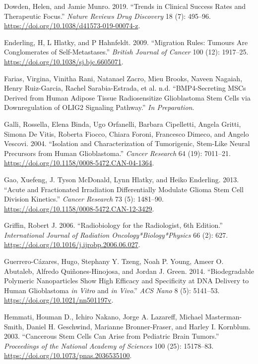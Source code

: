 \documentclass[
  default,
]{sn-jnl}
\newlength{\cslhangindent}
\newenvironment{CSLReferences}[2] %
 {\begin{list}{}{%
  \setlength{\itemindent}{0pt}
  \setlength{\leftmargin}{0pt}
  \setlength{\parsep}{0pt}
  \ifodd #1
   \setlength{\leftmargin}{\cslhangindent}
   \setlength{\itemindent}{-1\cslhangindent}
  \fi
  \setlength{\itemsep}{#2\baselineskip}}}
 {\end{list}}
\begin{document}
\begin{CSLReferences}{1}{0}
Dowden, Helen, and Jamie Munro. 2019. {``Trends in Clinical Success
Rates and Therapeutic Focus.''} \emph{Nature Reviews Drug Discovery} 18
(7): 495--96. \url{https://doi.org/10.1038/d41573-019-00074-z}.

Enderling, H, L Hlatky, and P Hahnfeldt. 2009. {``Migration Rules:
Tumours Are Conglomerates of Self-Metastases.''} \emph{British Journal
of Cancer} 100 (12): 1917--25.
\url{https://doi.org/10.1038/sj.bjc.6605071}.

Farias, Virgina, Vinitha Rani, Natanael Zacro, Mieu Brooks, Naveen
Nagaiah, Henry Ruiz-Garcia, Rachel Sarabia-Estrada, et al. n.d.
{``BMP4-Secreting MSCs Derived from Human Adipose Tissue Radiosensitize
Glioblastoma Stem Cells via Downregulation of OLIG2 Signaling
Pathway.''} \emph{In Preparation}.

Galli, Rossella, Elena Binda, Ugo Orfanelli, Barbara Cipelletti, Angela
Gritti, Simona De Vitis, Roberta Fiocco, Chiara Foroni, Francesco
Dimeco, and Angelo Vescovi. 2004. {``Isolation and Characterization of
Tumorigenic, Stem-Like Neural Precursors from Human Glioblastoma.''}
\emph{Cancer Research} 64 (19): 7011--21.
\url{https://doi.org/10.1158/0008-5472.CAN-04-1364}.

Gao, Xuefeng, J. Tyson McDonald, Lynn Hlatky, and Heiko Enderling. 2013.
{``Acute and Fractionated Irradiation Differentially Modulate Glioma
Stem Cell Division Kinetics.''} \emph{Cancer Research} 73 (5): 1481--90.
\url{https://doi.org/10.1158/0008-5472.CAN-12-3429}.

Griffin, Robert J. 2006. {``Radiobiology for the Radiologist, 6th
Edition.''} \emph{International Journal of Radiation
Oncology*Biology*Physics} 66 (2): 627.
\url{https://doi.org/10.1016/j.ijrobp.2006.06.027}.

Guerrero-Cázares, Hugo, Stephany Y. Tzeng, Noah P. Young, Ameer O.
Abutaleb, Alfredo Quiñones-Hinojosa, and Jordan J. Green. 2014.
{``Biodegradable Polymeric Nanoparticles Show High Efficacy and
Specificity at DNA Delivery to Human Glioblastoma {\emph{in Vitro}} and
{\emph{in Vivo}}.''} \emph{ACS Nano} 8 (5): 5141--53.
\url{https://doi.org/10.1021/nn501197v}.

Hemmati, Houman D., Ichiro Nakano, Jorge A. Lazareff, Michael
Masterman-Smith, Daniel H. Geschwind, Marianne Bronner-Fraser, and
Harley I. Kornblum. 2003. {``Cancerous Stem Cells Can Arise from
Pediatric Brain Tumors.''} \emph{Proceedings of the National Academy of
Sciences} 100 (25): 15178--83.
\url{https://doi.org/10.1073/pnas.2036535100}.


\end{CSLReferences}
\end{document}
